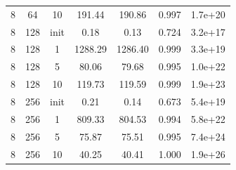 \begin{tabular}{ccccccc}
8 & 64 & 10 & 191.44 & 190.86 & 0.997 & 1.7e+20 \\
8 & 128 & init & 0.18 & 0.13 & 0.724 & 3.2e+17 \\
8 & 128 & 1 & 1288.29 & 1286.40 & 0.999 & 3.3e+19 \\
8 & 128 & 5 & 80.06 & 79.68 & 0.995 & 1.0e+22 \\
8 & 128 & 10 & 119.73 & 119.59 & 0.999 & 1.9e+23 \\
8 & 256 & init & 0.21 & 0.14 & 0.673 & 5.4e+19 \\
8 & 256 & 1 & 809.33 & 804.53 & 0.994 & 5.8e+22 \\
8 & 256 & 5 & 75.87 & 75.51 & 0.995 & 7.4e+24 \\
8 & 256 & 10 & 40.25 & 40.41 & 1.000 & 1.9e+26 \\
\bottomrule
\end{tabular}